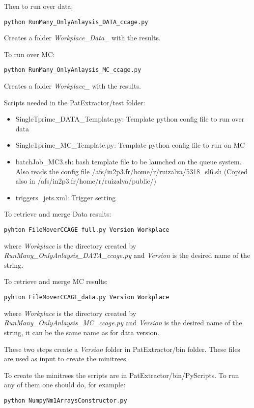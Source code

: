 \documentclass[11pt,a4paper]{article}
\begin{document}
Then to run over data:
\begin{verbatim}
python RunMany_OnlyAnlaysis_DATA_ccage.py
\end{verbatim}
Creates a folder \textit{Workplace\_Data\_\*} with the results.

To run over MC:
\begin{verbatim}
python RunMany_OnlyAnlaysis_MC_ccage.py
\end{verbatim}
Creates a folder \textit{Workplace\_\*} with the results.

Scripts needed in the PatExtractor/test folder:
\begin{itemize}
\item SingleTprime\_DATA\_Template.py: Template python config file to run over data
\item SingleTprime\_MC\_Template.py: Template python config file to run on MC
\item batchJob\_MC3.sh: bash template file to be launched on the queue system. Also reads the config file /afs/in2p3.fr/home/r/ruizalva/5318\_sl6.sh (Copied also in /afs/in2p3.fr/home/r/ruizalva/public/)
\item triggers\_jets.xml: Trigger setting
\end{itemize}

To retrieve and merge Data results:
\begin{verbatim}
pyhton FileMoverCCAGE_full.py Version Workplace
\end{verbatim}where \textit{Workplace} is the directory created by \textit{RunMany\_OnlyAnlaysis\_DATA\_ccage.py} and \textit{Version} is the desired name of the string.

To retrieve and merge MC results:
\begin{verbatim}
pyhton FileMoverCCAGE_data.py Version Workplace
\end{verbatim}where \textit{Workplace} is the directory created by \textit{RunMany\_OnlyAnlaysis\_MC\_ccage.py} and \textit{Version} is the desired name of the string, it can be the same name as for data version. 

These two steps create a \textit{Version} folder in PatExtractor/bin folder. These files are used as input to create the minitrees. 

To create the minitrees the scripts are in PatExtractor/bin/PyScripts. To run any of them one should do, for example:
\begin{verbatim}
python NumpyNm1ArraysConstructor.py
\end{verbatim}
\end{document}

